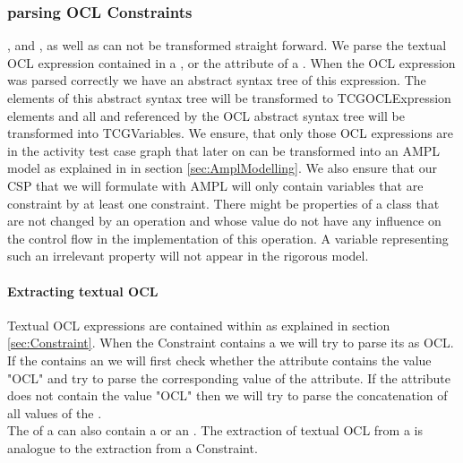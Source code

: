 \subsubsection{parsing OCL Constraints}
, and , as well as  can not be transformed straight forward. We parse the textual OCL expression contained in a , or the  attribute of a . When the OCL expression was parsed correctly we have an abstract syntax tree of this expression. The elements of this abstract syntax tree will be transformed to TCGOCLExpression elements and all  and  referenced by the OCL abstract syntax tree will be transformed into TCGVariables. We ensure, that only those OCL expressions are in the activity test case graph that later on can be transformed into an AMPL model as explained in in section \ref{sec:AmplModelling}. We also ensure that our CSP that we will formulate with AMPL will only contain variables that are constraint by at least one constraint. There might be properties of a class that are not changed by an operation and whose value do not have any influence on the control flow in the implementation of this operation. A variable representing such an irrelevant property will not appear in the rigorous model.
\paragraph{Extracting textual OCL}
Textual OCL expressions are contained within  as explained in section \ref{sec:Constraint}. When the Constraint contains a  we will try to parse its  as OCL. If the  contains an  we will first check whether the  attribute contains the value "OCL" and try to parse the corresponding value of the  attribute. If the  attribute does not contain the value "OCL" then we will try to parse the concatenation of all  values of the .\\ The  of a  can also contain a  or an . The extraction of textual OCL from a  is analogue to the extraction from a Constraint.
